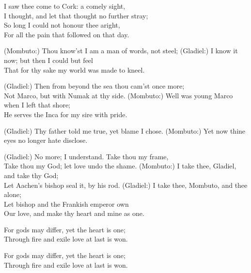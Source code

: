 \begin{lyrics}
I saw thee come to Cork: a comely sight,\\
I thought, and let that thought no further stray;\\
So long I could not honour thee aright,\\
For all the pain that followed on that day.

(Mombuto:) Thou know'st I am a man of words, not steel;
(Gladiel:) I know it now; but then I could but feel\\
That for thy sake my world was made to kneel.


(Gladiel:) Then from beyond the sea thou cam'st once more;\\
Not Marco, but with Numak at thy side.
(Mombuto:) Well was young Marco when I left that shore;\\
He serves the Inca for my sire with pride.

(Gladiel:) Thy father told me true, yet blame I chose.
(Mombuto:) Yet now thine eyes no longer hate disclose.

(Gladiel:) No more; I understand. Take thou my frame,\\
Take thou my God; let love undo the shame.
(Mombuto:) I take thee, Gladiel, and take thy God;\\
Let Aachen's bishop seal it, by his rod.
(Gladiel:) I take thee, Mombuto, and thee alone;\\
Let bishop and the Frankish emperor own\\
Our love, and make thy heart and mine as one.

For gods may differ, yet the heart is one;\\
Through fire and exile love at last is won.

For gods may differ, yet the heart is one;\\
Through fire and exile love at last is won.
\end{lyrics}

